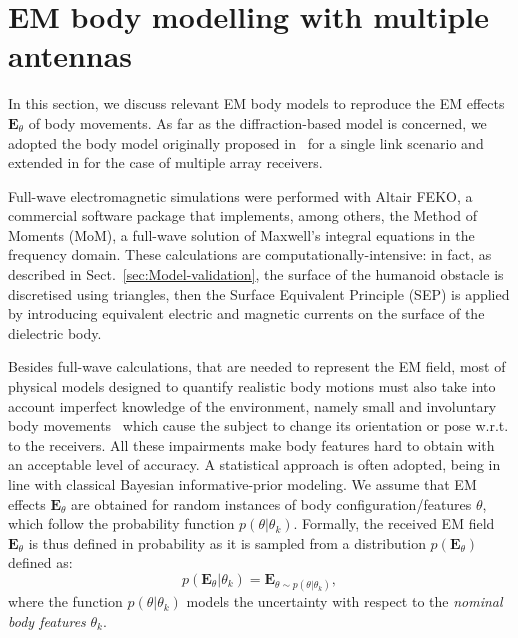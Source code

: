 \section{EM body modelling with multiple antennas \label{sec:Diffraction-models}}

In this section, we discuss relevant EM body models to reproduce the EM effects $\mathbf{E}_{\theta}$ of body movements. As far as the diffraction-based model is concerned, we adopted the body model originally proposed in~\cite{rampa-2017} for a single link scenario and extended in \cite{mimo} for the case of multiple array receivers. 

Full-wave electromagnetic simulations were performed with Altair\textsuperscript{\textregistered} FEKO\textsuperscript{\textregistered}, a commercial software package that implements, among others, the Method of Moments (MoM), a full-wave solution of Maxwell's integral equations in the frequency domain. These calculations are computationally-intensive: in fact, as described in Sect.~\ref{sec:Model-validation}, the surface of the humanoid obstacle is discretised using triangles, then the Surface Equivalent Principle (SEP) is applied by introducing equivalent electric and magnetic currents on the surface of the dielectric body. 

Besides full-wave calculations, that are needed to represent the EM field, most of physical models designed to quantify realistic body motions must also take into account imperfect knowledge of the environment, namely small and involuntary body movements~\cite{rampa-2017} which cause the subject to change its orientation or pose w.r.t. to the receivers. All these impairments make body features hard to obtain with an acceptable level of accuracy. A statistical approach is often adopted, being in line with classical Bayesian informative-prior modeling. We assume that EM effects $\mathbf{E}_{\theta}$ are obtained for random instances of body configuration/features $\theta$, which follow the probability function $p(\theta|\theta_{k})$. Formally, the received EM field $\mathbf{E}_{\theta}$ is thus defined in probability as it is sampled from a distribution $p(\mathbf{E}_{\theta})$ defined as: 
\begin{equation}
p(\mathbf{E}_{\theta}|\theta_{k})=\mathbf{\mathbf{E}}_{\theta\sim p(\theta|\theta_{k})},\label{eq:samp}
\end{equation}
where the function $p(\theta|\theta_{k})$ models the uncertainty with respect to the \emph{nominal body features} $\theta_{k}$.

